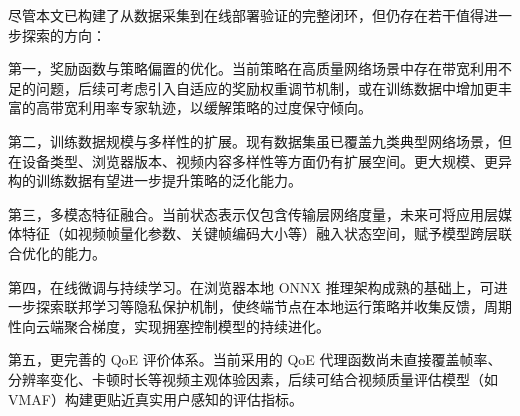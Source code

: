 尽管本文已构建了从数据采集到在线部署验证的完整闭环，但仍存在若干值得进一步探索的方向：

第一，奖励函数与策略偏置的优化。当前策略在高质量网络场景中存在带宽利用不足的问题，后续可考虑引入自适应的奖励权重调节机制，或在训练数据中增加更丰富的高带宽利用率专家轨迹，以缓解策略的过度保守倾向。

第二，训练数据规模与多样性的扩展。现有数据集虽已覆盖九类典型网络场景，但在设备类型、浏览器版本、视频内容多样性等方面仍有扩展空间。更大规模、更异构的训练数据有望进一步提升策略的泛化能力。

第三，多模态特征融合。当前状态表示仅包含传输层网络度量，未来可将应用层媒体特征（如视频帧量化参数、关键帧编码大小等）融入状态空间，赋予模型跨层联合优化的能力。

第四，在线微调与持续学习。在浏览器本地 ONNX 推理架构成熟的基础上，可进一步探索联邦学习等隐私保护机制，使终端节点在本地运行策略并收集反馈，周期性向云端聚合梯度，实现拥塞控制模型的持续进化。

第五，更完善的 QoE 评价体系。当前采用的 QoE 代理函数尚未直接覆盖帧率、分辨率变化、卡顿时长等视频主观体验因素，后续可结合视频质量评估模型（如 VMAF）构建更贴近真实用户感知的评估指标。